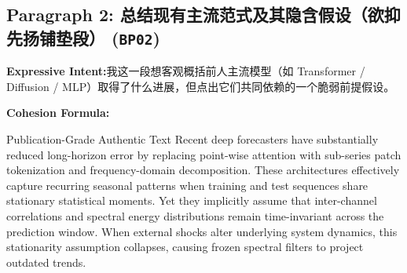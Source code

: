 \subsection*{Paragraph 2: 总结现有主流范式及其隐含假设（欲抑先扬铺垫段） (\texttt{BP02})}
\noindent\textbf{Expressive Intent:}\enspace 我这一段想客观概括前人主流模型（如 Transformer / Diffusion / MLP）取得了什么进展，但点出它们共同依赖的一个脆弱前提假设。\par
\noindent\textbf{Cohesion Formula:}\par\vspace{4pt}
\begin{ExampleBox}{Publication-Grade Authentic Text}
Recent deep forecasters have substantially reduced long-horizon error by replacing point-wise attention with sub-series patch tokenization and frequency-domain decomposition. These architectures effectively capture recurring seasonal patterns when training and test sequences share stationary statistical moments. Yet they implicitly assume that inter-channel correlations and spectral energy distributions remain time-invariant across the prediction window. When external shocks alter underlying system dynamics, this stationarity assumption collapses, causing frozen spectral filters to project outdated trends.
\end{ExampleBox}
